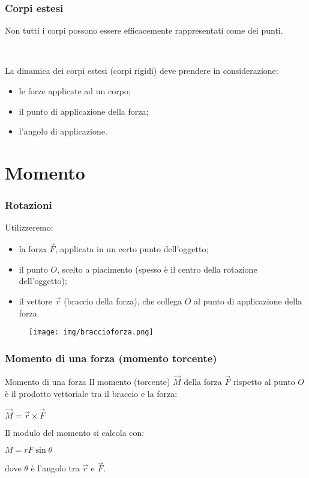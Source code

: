 \documentclass[]{beamer}
\theoremstyle{plain}
\begin{document}
\begin{frame}
\frametitle{Corpi estesi}
Non tutti i corpi possono essere efficacemente rappresentati come dei punti.\pause

~

La \alert{dinamica dei corpi estesi} (corpi rigidi) deve prendere in considerazione:
\begin{itemize}
  \item le forze applicate ad un corpo;
  \item il punto di applicazione della forza;
  \item l'angolo di applicazione.
\end{itemize}
\end{frame}



\section{Momento}

\begin{frame}
\frametitle{Rotazioni}
Utilizzeremo:
\begin{itemize}
  \item la \alert<1>{forza $ \vec{F} $}, applicata in un certo punto dell'oggetto;\pause
  \item il \alert<2>{punto $ O $}, scelto a piacimento (spesso è il centro della rotazione dell'oggetto);\pause
  \item il \alert<3>{vettore $ \vec{r} $} (braccio della forza), che collega $ O $ al punto di applicazione della forza.
\end{itemize}
\begin{figure}
\texttt{[image: img/braccioforza.png]}
\end{figure}
\end{frame}


\begin{frame}
\frametitle{Momento di una forza (momento torcente)}
\begin{block}{Momento di una forza}
Il momento (torcente) $ \vec{M} $ della forza $ \vec{F} $ rispetto al punto $ O $ è il prodotto vettoriale tra il braccio e la forza:
\begin{center}
\colorbox{blue!30}{$ \vec{M} = \vec{r} \times \vec{F} $}
\end{center}\pause
Il modulo del momento si calcola con:
\begin{center}
$ M = rF\sin\theta $
\end{center}
dove $ \theta $ è l'angolo tra $ \vec{r} $ e $ \vec{F} $.
\end{block}
\end{frame}
\end{document}
